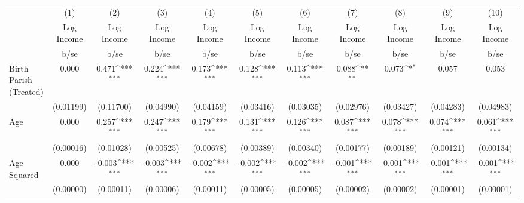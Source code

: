 {
\def\sym#1{\ifmmode^{#1}\else\(^{#1}\)\fi}
\begin{tabular}{l*{10}{c}}
\hline\hline
                    &\multicolumn{1}{c}{(1)}&\multicolumn{1}{c}{(2)}&\multicolumn{1}{c}{(3)}&\multicolumn{1}{c}{(4)}&\multicolumn{1}{c}{(5)}&\multicolumn{1}{c}{(6)}&\multicolumn{1}{c}{(7)}&\multicolumn{1}{c}{(8)}&\multicolumn{1}{c}{(9)}&\multicolumn{1}{c}{(10)}\\
                    &\multicolumn{1}{c}{Log Income}&\multicolumn{1}{c}{Log Income}&\multicolumn{1}{c}{Log Income}&\multicolumn{1}{c}{Log Income}&\multicolumn{1}{c}{Log Income}&\multicolumn{1}{c}{Log Income}&\multicolumn{1}{c}{Log Income}&\multicolumn{1}{c}{Log Income}&\multicolumn{1}{c}{Log Income}&\multicolumn{1}{c}{Log Income}\\
                    &        b/se         &        b/se         &        b/se         &        b/se         &        b/se         &        b/se         &        b/se         &        b/se         &        b/se         &        b/se         \\
\hline
Birth Parish (Treated)&       0.000         &       0.471\sym{***}&       0.224\sym{***}&       0.173\sym{***}&       0.128\sym{***}&       0.113\sym{***}&       0.088\sym{**} &       0.073\sym{*}  &       0.057         &       0.053         \\
                    &   (0.01199)         &   (0.11700)         &   (0.04990)         &   (0.04159)         &   (0.03416)         &   (0.03035)         &   (0.02976)         &   (0.03427)         &   (0.04283)         &   (0.04983)         \\
Age                 &       0.000         &       0.257\sym{***}&       0.247\sym{***}&       0.179\sym{***}&       0.131\sym{***}&       0.126\sym{***}&       0.087\sym{***}&       0.078\sym{***}&       0.074\sym{***}&       0.061\sym{***}\\
                    &   (0.00016)         &   (0.01028)         &   (0.00525)         &   (0.00678)         &   (0.00389)         &   (0.00340)         &   (0.00177)         &   (0.00189)         &   (0.00121)         &   (0.00134)         \\
Age Squared         &       0.000         &      -0.003\sym{***}&      -0.003\sym{***}&      -0.002\sym{***}&      -0.002\sym{***}&      -0.002\sym{***}&      -0.001\sym{***}&      -0.001\sym{***}&      -0.001\sym{***}&      -0.001\sym{***}\\
                    &   (0.00000)         &   (0.00011)         &   (0.00006)         &   (0.00011)         &   (0.00005)         &   (0.00005)         &   (0.00002)         &   (0.00002)         &   (0.00001)         &   (0.00001)         \\

\end{tabular}}

